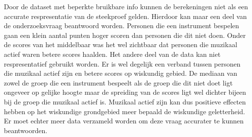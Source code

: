 \documentclass{hogent-article}
\begin{document}
Door de dataset met beperkte bruikbare info kunnen de berekeningen niet als een accurate respresentatie van de steekproef gelden. Hierdoor kan maar een deel van de onderzoeksvraag beantwoord worden. Personen die een instrument bespelen gaan een klein aantal punten hoger scoren dan personen die dit niet doen. Onder de scores van het middelbaar was het wel zichtbaar dat personen die muzikaal actief waren betere scores haalden. Het andere deel van de data kan niet respresentatief gebruikt worden. Er is wel degelijk een verband tussen personen die muzikaal actief zijn en betere scores op wiskundig gebied. De mediaan van zowel de groep die een instrument bespeelt als de groep die dit niet doet ligt ongeveer op gelijke hoogte maar de spreiding van de scores ligt wel dichter bijeen bij de groep die muzikaal actief is. Muzikaal actief zijn kan dus positieve effecten hebben op het wiskundige grondgebied meer bepaald de wiskundige geletterheid. Er moet echter meer data verzameld worden om deze vraag accurater te kunnen beantwoorden. 


\printbibliography[heading=bibintoc]
\end{document}
